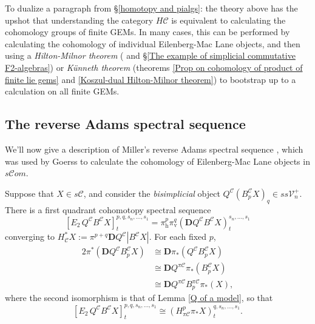 \documentclass[11pt]{amsart} \renewcommand{\baselinestretch}{1.4}
\theoremstyle{plain}
\theoremstyle{definition}
\newcommand{\scrC}{\mathscr{C}}
\newcommand{\calC}{\mathcal{C}}
\newcommand{\calV}{\mathcal{V}}
\newcommand{\calc}{\mathcal{C}}
\newcommand{\citeBOX}[2][]{\cite[\mbox{#1}]{#2}}
\newcommand{\vect}[2]{\calV^{#1}_{#2}}
\newcommand{\PA}[1]{\pi#1}
\newcommand{\HA}[1]{H#1}
\newcommand{\algs}{{\scrC\!\textit{om}}}
\newcommand{\Edown}[4]{[E_{#1}#2]^{#3}_{#4}}
\newcommand{\uver}{^\mathrm{v}}
\newcommand{\dver}{_\mathrm{v}}
\newcommand{\dhor}{_\mathrm{h}}
\newcommand{\diag}[1]{|#1|}
\newcommand{\dual}{\mathbf{D}}
\begin{document}
\begin{Pi-algebras and cohomology algebras}
To dualize a paragraph from \S\ref{homotopy and pialgs}: the theory above has the upshot that understanding the category $\HA{\calc}$ is equivalent to calculating the cohomology groups of finite GEMs. In many cases, this can be performed by calculating the cohomology of individual Eilenberg-Mac Lane objects, and then using a \emph{Hilton-Milnor theorem} (\citeBOX[\S11]{MR1089001} and \S\ref{The example of simplicial commutative F2-algebras}) or \emph{K\"unneth theorem} (theorems \ref{Prop on cohomology of product of finite lie gems} and \ref{Koszul-dual Hilton-Milnor theorem}) to bootstrap up to a calculation on all finite GEMs.

\subsection{The reverse Adams spectral sequence}
\label{reverse Adams spectral sequence}
We'll now give a description of Miller's reverse Adams spectral sequence \citeBOX[\S4]{MillerSullivanConjecture.pdf}, which was used by Goerss \cite[Chapter V]{MR1089001} to calculate the cohomology of Eilenberg-Mac Lane objects in $s\algs$.

Suppose that $X\in s\calC$, and consider the \emph{bisimplicial} object $Q^{\calc}(B^{\calc}_pX)_{q}\in ss\vect{+}{n}$. There is a first quadrant cohomotopy spectral sequence
\[\Edown{2}{\,Q^{\calc}B^{\calc}X}{p,q,s_n,\ldots,s_1}{t}=\pi\dhor^{p}\pi\dver^{q}(\dual Q^{\calc}B^{\calc}X)^{s_n,\ldots,s_1}_{t}\]
converging to $H^*_{\calc}X:=\pi^{p+q}\dual Q^{\calc}\diag{B^{\calc}X}$. For each fixed $p$, %
\begin{alignat*}{2}
\pi^{*}(\dual Q^{\calc}B^{\calc}_p X)&\cong\dual \pi_{*}(Q^{\calc}B^{\calc}_p X)\\
&\cong\dual Q^{\PA{\calc}}\pi_{*}(B^{\calc}_p X)\\
&\cong\dual Q^{\PA{\calc}}B^{\PA{\calc}}_p \pi_{*}(X),{}
\end{alignat*}
where the second isomorphism is that of Lemma \ref{Q of a model}, so that 
\[\Edown{2}{\,Q^{\calc}B^{\calc}X}{p,q,s_n,\ldots,s_1}{t}\cong (H^{p}_{\PA{\calc}}\pi_*X)^{q,s_n,\ldots,s_1}_{t}.\]


\end{Pi-algebras and cohomology algebras}
\end{document}

